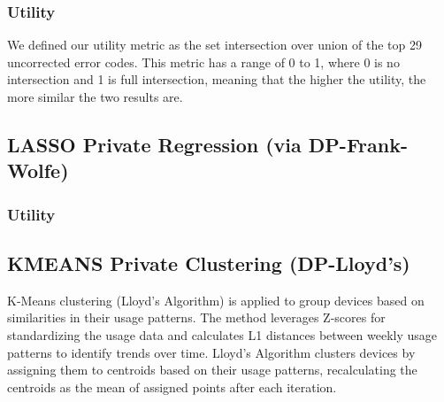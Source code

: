 \documentclass[12pt,letterpaper]{article}
\begin{document}
\subsubsection{Utility}

We defined our utility metric as the set intersection over union of the top 29 uncorrected error codes.
This metric has a range of 0 to 1, where 0 is no intersection and 1 is full intersection,
meaning that the higher the utility, the more similar the two results are.

\subsection{LASSO Private Regression (via DP-Frank-Wolfe)}








\subsubsection{Utility}

\subsection{KMEANS Private Clustering (DP-Lloyd's)}
K-Means clustering (Lloyd's Algorithm) is applied to group devices based on similarities in their usage patterns. The method leverages Z-scores for standardizing the usage data and calculates L1 distances between weekly usage patterns to identify trends over time. Lloyd's Algorithm clusters devices by assigning them to centroids based on their usage patterns, recalculating the centroids as the mean of assigned points after each iteration. 
\end{document}
